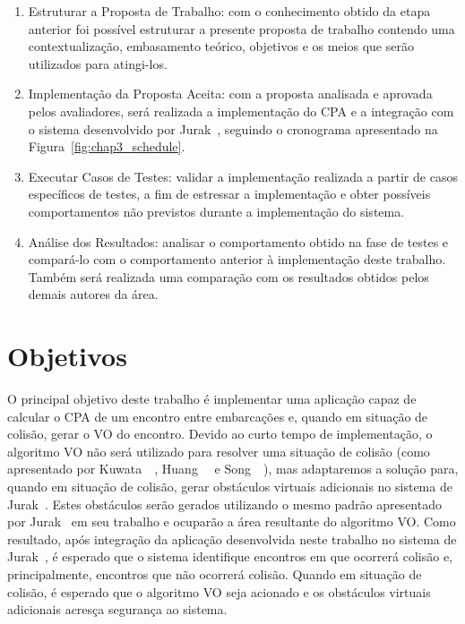 \begin{enumerate}[label=\alph*)]
            \item Estruturar a Proposta de Trabalho: com o conhecimento obtido da etapa anterior foi possível estruturar a presente proposta de trabalho contendo uma contextualização, embasamento teórico, objetivos e os meios que serão utilizados para atingi-los.
            
            \item Implementação da Proposta Aceita: com a proposta analisada e aprovada pelos avaliadores, será realizada a implementação do CPA e a integração com o sistema desenvolvido por Jurak~\cite{JURAK2020}, seguindo o cronograma apresentado na Figura~\ref{fig:chap3_schedule}.
            
            \item Executar Casos de Testes: validar a implementação realizada a partir de casos específicos de testes, a fim de estressar a implementação e obter possíveis comportamentos não previstos durante a implementação do sistema.
            
            \item Análise dos Resultados: analisar o comportamento obtido na fase de testes e compará-lo com o comportamento anterior à implementação deste trabalho. Também será realizada uma comparação com os resultados obtidos pelos demais autores da área. 
        \end{enumerate}
        
    \section{Objetivos}
    
        O principal objetivo deste trabalho é implementar uma aplicação capaz de calcular o CPA de um encontro entre embarcações e, quando em situação de colisão, gerar o VO do encontro. Devido ao curto tempo de implementação, o algoritmo VO não será utilizado para resolver uma situação de colisão (como apresentado por Kuwata~\etal~\cite{KUWATA2014110}, Huang~\etal~\cite{HUANG2019142} e Song~\etal~\cite{SONG2018351}), mas adaptaremos a solução para, quando em situação de colisão, gerar obstáculos virtuais adicionais no sistema de Jurak~\cite{JURAK2020}. Estes obstáculos serão gerados utilizando o mesmo padrão apresentado por Jurak~\cite{JURAK2020} em seu trabalho e ocuparão a área resultante do algoritmo VO. Como resultado, após integração da aplicação desenvolvida neste trabalho no sistema de Jurak~\cite{JURAK2020}, é esperado que o sistema identifique encontros em que ocorrerá colisão e, principalmente, encontros que não ocorrerá colisão. Quando em situação de colisão, é esperado que o algoritmo VO seja acionado e os obstáculos virtuais adicionais acresça segurança ao sistema.
        
